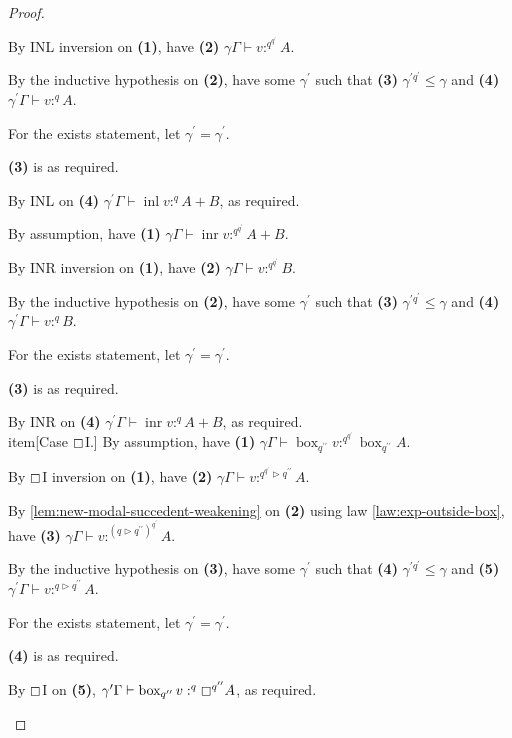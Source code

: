 \documentclass[acmsmall,screen,nonacm]{acmart}
\DeclareMathOperator{\bbox}{\text{box}}
\DeclareMathOperator{\inl}{\text{inl}}
\DeclareMathOperator{\inr}{\text{inr}}
\newcommand{\tee}{\vdash}
\DeclareMathOperator{\boxop}{\mathbin{\triangleright}}
\begin{document}
\begin{proof}
\begin{description}
    By INL inversion on \textbf{(1)}, have \textbf{(2)} $\gamma\Gamma \tee v :^{q^{q^\prime}} A$.

    By the inductive hypothesis on \textbf{(2)}, have some $\gamma^\prime$ such that \textbf{(3)} $\gamma^{\prime{q^\prime}} \le \gamma$ and \textbf{(4)} $\gamma^\prime\Gamma \tee v :^q A$.

    For the exists statement, let $\gamma^\prime = \gamma^\prime$.

    \textbf{(3)} is as required.

    By INL on \textbf{(4)} $\gamma^\prime\Gamma \tee \inl v :^q A + B$, as required.
    \\
    \item[Case INR.]
    By assumption, have \textbf{(1)} $\gamma\Gamma \tee \inr v :^{q^{q^\prime}} A + B$.

    By INR inversion on \textbf{(1)}, have \textbf{(2)} $\gamma\Gamma \tee v :^{q^{q^\prime}} B$.

    By the inductive hypothesis on \textbf{(2)}, have some $\gamma^\prime$ such that \textbf{(3)} $\gamma^{\prime{q^\prime}} \le \gamma$ and \textbf{(4)} $\gamma^\prime\Gamma \tee v :^q B$.

    For the exists statement, let $\gamma^\prime = \gamma^\prime$.

    \textbf{(3)} is as required.

    By INR on \textbf{(4)} $\gamma^\prime\Gamma \tee \inr v :^q A + B$, as required.
    \\
    item[Case $\boxempty$I.]
    By assumption, have \textbf{(1)} $\gamma\Gamma \tee \bbox_{q^{\prime\prime}} v :^{q^{q^\prime}} \bbox_{q^{\prime\prime}} A$.

    By $\boxempty$I inversion on \textbf{(1)}, have \textbf{(2)} $\gamma\Gamma \tee v :^{q^{q^\prime} \boxop q^{\prime\prime}} A$.

    By \ref{lem:new-modal-succedent-weakening} on \textbf{(2)} using law \ref{law:exp-outside-box}, have \textbf{(3)} $\gamma\Gamma \tee v :^{(q \boxop q^{\prime\prime})^{q^\prime}} A$.

    By the inductive hypothesis on \textbf{(3)}, have some $\gamma^\prime$ such that \textbf{(4)} $\gamma^{\prime{q^\prime}} \le \gamma$ and \textbf{(5)} $\gamma^\prime\Gamma \tee v :^{q \boxop q^{\prime\prime}} A$.

    For the exists statement, let $\gamma^\prime = \gamma^\prime$.

    \textbf{(4)} is as required.

    By $\boxempty$I on \textbf{(5)}, $\gamma^\prime\Gamma \tee \bbox_{q^{\prime\prime}} v :^q \boxempty^{q^{\prime\prime}} A$, as required.
    \\
  \end{description}
\end{proof}
\end{document}
